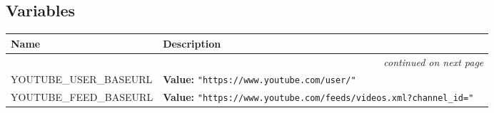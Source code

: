 
  \subsection{Variables}

    \vspace{-1cm}
\hspace{\varindent}\begin{longtable}{|p{\varnamewidth}|p{\vardescrwidth}|l}
\cline{1-2}
\cline{1-2} \centering \textbf{Name} & \centering \textbf{Description}& \\
\cline{1-2}
\endhead\cline{1-2}\multicolumn{3}{r}{\small\textit{continued on next page}}\\\endfoot\cline{1-2}
\endlastfoot\raggedright Y\-O\-U\-T\-U\-B\-E\-\_\-U\-S\-E\-R\-\_\-B\-A\-S\-E\-U\-R\-L\- & \raggedright \textbf{Value:} 
{\tt "https://www.youtube.com/user/"}&\\
\cline{1-2}
\raggedright Y\-O\-U\-T\-U\-B\-E\-\_\-F\-E\-E\-D\-\_\-B\-A\-S\-E\-U\-R\-L\- & \raggedright \textbf{Value:} 
{\tt "https://www.youtube.com/feeds/videos.xml?channel\_id="}&\\
\cline{1-2}
\end{longtable}

